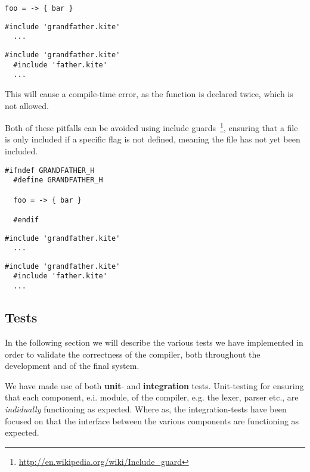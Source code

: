 \begin{lstlisting}[caption=\code{grandfather.kite}]
  foo = -> { bar }
\end{lstlisting}

\begin{lstlisting}[caption=\code{father.kite}]
  #include 'grandfather.kite'
  ...
\end{lstlisting}

\begin{lstlisting}[caption=\code{child.kite}]
  #include 'grandfather.kite'
  #include 'father.kite'
  ...
\end{lstlisting}

This will cause a compile-time error, as the  function is
declared twice, which is not allowed.

Both of these pitfalls can be avoided using include
guards~\footnote{\url{http://en.wikipedia.org/wiki/Include_guard}},
ensuring that a file is only included if a specific flag is not
defined, meaning the file has not yet been included.

\begin{lstlisting}[caption=\code{grandfather.kite}]
  #ifndef GRANDFATHER_H
  #define GRANDFATHER_H

  foo = -> { bar }

  #endif
\end{lstlisting}

\begin{lstlisting}[caption=\code{father.kite}]
  #include 'grandfather.kite'
  ...
\end{lstlisting}

\begin{lstlisting}[caption=\code{child.kite}]
  #include 'grandfather.kite'
  #include 'father.kite'
  ...
\end{lstlisting}


\subsection{Tests}
In the following section we will describe the various tests we have
implemented in order to validate the correctness of the compiler, both
throughout the development and of the final system.

We have made use of both \textbf{unit}- and \textbf{integration}
tests. Unit-testing for ensuring that each component, e.i. module, of the compiler,
e.g. the lexer, parser etc., are \emph{indidually} functioning as
expected. Where as, the integration-tests have been focused on that
the interface between the various components are functioning as
expected.

